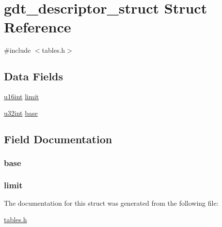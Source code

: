 \hypertarget{structgdt__descriptor__struct}{}\section{gdt\+\_\+descriptor\+\_\+struct Struct Reference}
\label{structgdt__descriptor__struct}


{\ttfamily \#include $<$tables.\+h$>$}

\subsection*{Data Fields}
\begin{DoxyCompactItemize}
\item 
\hyperlink{system_8h_a863d9497073aad2b991aeab2211d87af}{u16int} \hyperlink{structgdt__descriptor__struct_a68fd3b4f6c14a331ca9b226cbf122e13}{limit}
\item 
\hyperlink{system_8h_a757de76cafbcddaac0d1632902fe4cb8}{u32int} \hyperlink{structgdt__descriptor__struct_ab5763c2b18c825c8b8fba44b2e60ddc1}{base}
\end{DoxyCompactItemize}


\subsection{Field Documentation}
\hypertarget{structgdt__descriptor__struct_ab5763c2b18c825c8b8fba44b2e60ddc1}{}
\subsubsection[{base}]{ base}\label{structgdt__descriptor__struct_ab5763c2b18c825c8b8fba44b2e60ddc1}
\hypertarget{structgdt__descriptor__struct_a68fd3b4f6c14a331ca9b226cbf122e13}{}
\subsubsection[{limit}]{ limit}\label{structgdt__descriptor__struct_a68fd3b4f6c14a331ca9b226cbf122e13}


The documentation for this struct was generated from the following file\+:\begin{DoxyCompactItemize}
\item 
\hyperlink{tables_8h}{tables.\+h}\end{DoxyCompactItemize}

